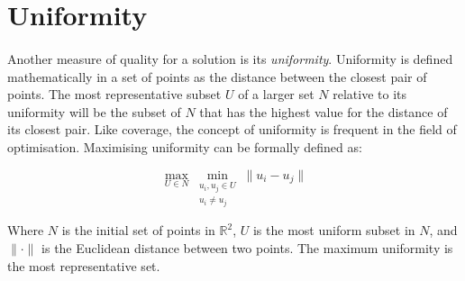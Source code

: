 \section{Uniformity}
\paragraph{}
Another measure of quality for a solution is its \emph{uniformity}. Uniformity is defined mathematically in a set of points as the distance between the closest pair of points. The most representative subset $U$ of a larger set $N$ relative to its uniformity will be the subset of $N$ that has the highest value for the distance of its closest pair. Like coverage, the concept of uniformity is frequent in the field of optimisation. Maximising uniformity can be formally defined as:

\begin{equation}
\max_{U \in N}{\min_{\substack{u_i,u_j \in U \\ u_i \neq u_j}}{\lVert u_i-u_j \rVert}}
\end{equation}

\noindent
Where $N$ is the initial set of points in $\mathbb{R}^2$, $U$ is the most uniform subset in $N$, and $\lVert \cdot \rVert$ is the Euclidean distance between two points. The maximum uniformity is the most representative set.